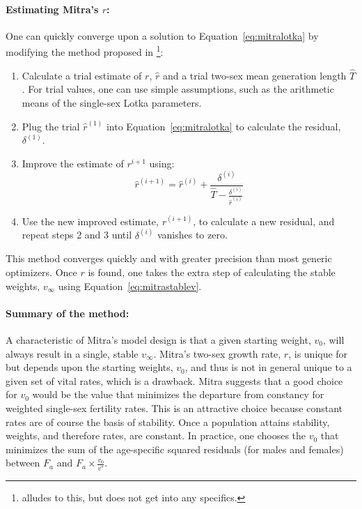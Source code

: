 \paragraph{Estimating Mitra's $r$: } One can quickly converge upon a solution
to Equation~\eqref{eq:mitralotka} by modifying the method proposed in
\citet{coale1957new}\footnote{\citet{mitra1978derivation} alludes to this, but
does not get into any specifics.}:
\begin{enumerate}
  \item Calculate a trial estimate of $r$,
$\widehat{r}$ and a trial two-sex mean generation length
$\widehat{T}$. For trial values, one can use simple
assumptions, such as the arithmetic means of the single-sex Lotka parameters.
  \item Plug the trial $\widehat{r}^{(1)}$ into Equation~\eqref{eq:mitralotka}
  to calculate the residual, $\delta ^{(1)}$.
  \item Improve the estimate of $r^{i+1}$ using:
  \begin{equation}
  \widehat{r}^{(i+1)} = \widehat{r}^{(i)} + \frac{\delta^{(i)}}{\widehat{T} -
\frac{\delta ^{(i)}}{\widehat{r}^{(i)} }}
  \end{equation}
  \item Use the new improved estimate, $r^{(i+1)}$, to calculate a new residual,
  and repeat steps 2 and 3 until $\delta^{(i)}$ vanishes to zero.
\end{enumerate}

This method converges quickly and with greater precision than most
generic optimizers. Once $r$ is found, one takes the extra step of calculating
the stable weights, $v_\infty$ using Equation~\eqref{eq:mitrastablev}.

\paragraph{Summary of the method: } A characteristic of Mitra's model design is
that a given starting weight, $v_0$, will always result in a single, stable
$v_\infty$. Mitra's two-sex growth rate,
$r$, is unique for but depends upon the starting weights, $v_0$, and thus is not 
in general unique to a given set of vital rates, which is a drawback. Mitra
suggests that a good choice for $v_0$ would be the value that minimizes the 
departure from constancy for weighted single-sex fertility rates. This is an 
attractive choice because constant rates are of course the
basis of stability. Once a population attains stability, weights, and therefore 
rates, are constant. In practice, one chooses the $v_0$ that minimizes the sum
of the age-specific squared residuals (for males and females) between $F_a$ and 
$F_a \times \tfrac{v_0}{v^\ast}$.

